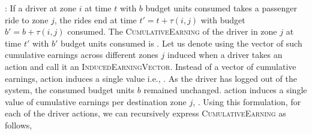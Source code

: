:
If a driver at zone $i$ at time $t$ with $b$ budget units consumed takes a passenger ride to zone $j$, the rides end at time 
$t' = t + \tau(i,j)$ with budget $b' = b + \tau(i,j)$ consumed. The \textsc{CumulativeEarning} of the driver in zone $j$ at time $t'$ with $b'$
budget units consumed is {}. Let us denote using {} the vector of such
cumulative earnings across different zones $j$ induced when a driver takes an action {\getpassengeraction} and call it an 
\textsc{InducedEarningVector}. Instead of a vector of cumulative earnings, {\gohome} action induces a single value i.e., {}. 
As the driver has logged out of the system, the consumed budget units $b$ remained unchanged. {\relocate} action induces a single value of cumulative earnings per destination zone $j$, {}. 
Using this formulation, for each of the driver actions, we can recursively express \textsc{CumulativeEarning} as follows,
